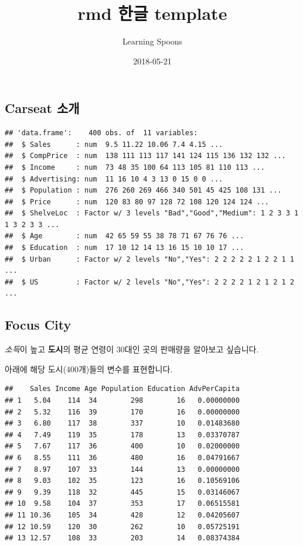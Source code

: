 \documentclass[a4paper]{article}
\title{rmd 한글 template}
\author{Learning Spoons}
\date{2018-05-21}
\begin{document}
\maketitle

\subsection{Carseat 소개}\label{carseat-}

\begin{verbatim}
## 'data.frame':    400 obs. of  11 variables:
##  $ Sales      : num  9.5 11.22 10.06 7.4 4.15 ...
##  $ CompPrice  : num  138 111 113 117 141 124 115 136 132 132 ...
##  $ Income     : num  73 48 35 100 64 113 105 81 110 113 ...
##  $ Advertising: num  11 16 10 4 3 13 0 15 0 0 ...
##  $ Population : num  276 260 269 466 340 501 45 425 108 131 ...
##  $ Price      : num  120 83 80 97 128 72 108 120 124 124 ...
##  $ ShelveLoc  : Factor w/ 3 levels "Bad","Good","Medium": 1 2 3 3 1 1 3 2 3 3 ...
##  $ Age        : num  42 65 59 55 38 78 71 67 76 76 ...
##  $ Education  : num  17 10 12 14 13 16 15 10 10 17 ...
##  $ Urban      : Factor w/ 2 levels "No","Yes": 2 2 2 2 2 1 2 2 1 1 ...
##  $ US         : Factor w/ 2 levels "No","Yes": 2 2 2 2 1 2 1 2 1 2 ...
\end{verbatim}

\subsection{Focus City}\label{focus-city}

\emph{소득}이 높고 \textbf{도시}의 평균 연령이 30대인 곳의 판매량을
알아보고 싶습니다.

아래에 해당 도시(400개)들의 변수를 표현합니다.

\begin{verbatim}
##    Sales Income Age Population Education AdvPerCapita
## 1   5.04    114  34        298        16   0.00000000
## 2   5.32    116  39        170        16   0.00000000
## 3   6.80    117  38        337        10   0.01483680
## 4   7.49    119  35        178        13   0.03370787
## 5   7.67    117  36        400        10   0.02000000
## 6   8.55    111  36        480        16   0.04791667
## 7   8.97    107  33        144        13   0.00000000
## 8   9.03    102  35        123        16   0.10569106
## 9   9.39    118  32        445        15   0.03146067
## 10  9.58    104  37        353        17   0.06515581
## 11 10.36    105  34        428        12   0.04205607
## 12 10.59    120  30        262        10   0.05725191
## 13 12.57    108  33        203        14   0.08374384
\end{verbatim}
\end{document}
